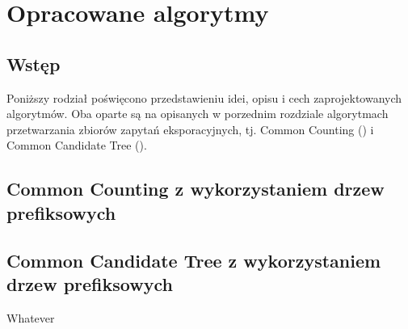 \chapter{Opracowane algorytmy}
\label{c4}

\section{Wstęp}
\label{c41}
Poniższy rodział poświęcono przedstawieniu idei, opisu i cech zaprojektowanych algorytmów. Oba oparte są na opisanych w porzednim rozdziale algorytmach przetwarzania zbiorów zapytań eksporacyjnych, tj. Common Counting (\cite{WojciechowskiCC}) i Common Candidate Tree (\cite{WojciechowskiCCT}). 

\section{Common Counting z wykorzystaniem drzew prefiksowych}
\label{c42}



\section{Common Candidate Tree z wykorzystaniem drzew prefiksowych}
\label{c43}

Whatever